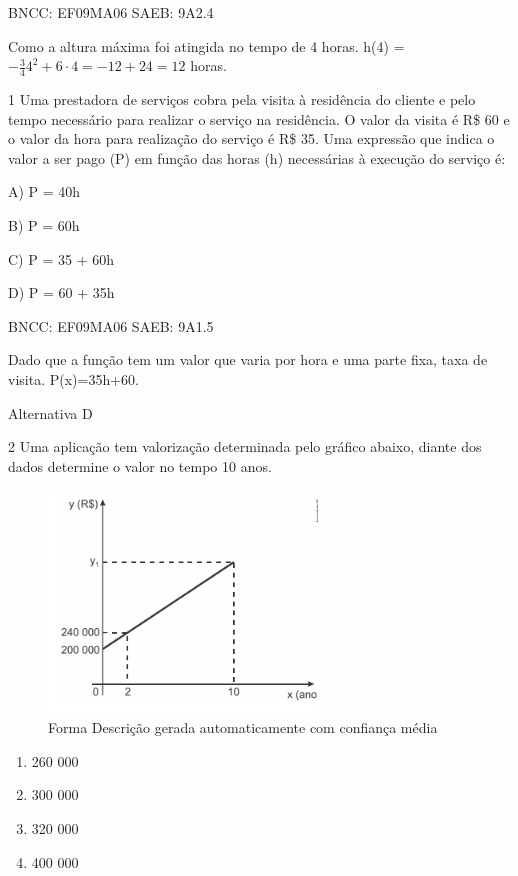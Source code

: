 \begin{escolha}
{{{\begin{escolha}
{{{BNCC: EF09MA06 SAEB: 9A2.4

Como a altura máxima foi atingida no tempo de 4 horas. h(4) =
\(- \frac{3}{4}4^{2} + 6 \cdot 4 = - 12 + 24 = 12\) horas.


\num{1} Uma prestadora de serviços cobra pela visita à residência do
cliente e pelo tempo necessário para realizar o serviço na residência. O
valor da visita é R\$ 60 e o valor da hora para realização do serviço é
R\$ 35. Uma expressão que indica o valor a ser pago (P) em função das
horas (h) necessárias à execução do serviço é:

A) P = 40h

B) P = 60h

C) P = 35 + 60h

D) P = 60 + 35h

BNCC: EF09MA06 SAEB: 9A1.5

Dado que a função tem um valor que varia por hora e uma parte fixa, taxa
de visita. P(x)=35h+60.

Alternativa D

\num{2} Uma aplicação tem valorização determinada pelo gráfico abaixo,
diante dos dados determine o valor no tempo 10 anos.

\begin{figure}
\centering
\includegraphics[width=2.80858in,height=2.3252in]{./_SAEB_9_MAT/media/image155.png}
\caption{Forma Descrição gerada automaticamente com confiança média}
\end{figure}

\begin{enumerate}

\item
  260 000
\item
  300 000
\item
  320 000
\item
  400 000
\end{enumerate}

}}}
\end{escolha}}}}
\end{escolha}
